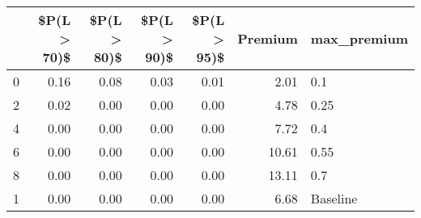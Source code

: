 \begin{tabular}{lrrrrrl}
\toprule
{} &  \$P(L > 70)\$ &  \$P(L > 80)\$ &  \$P(L > 90)\$ &  \$P(L > 95)\$ &  Premium & max\_premium \\
\midrule
0 &         0.16 &         0.08 &         0.03 &         0.01 &     2.01 &         0.1 \\
2 &         0.02 &         0.00 &         0.00 &         0.00 &     4.78 &        0.25 \\
4 &         0.00 &         0.00 &         0.00 &         0.00 &     7.72 &         0.4 \\
6 &         0.00 &         0.00 &         0.00 &         0.00 &    10.61 &        0.55 \\
8 &         0.00 &         0.00 &         0.00 &         0.00 &    13.11 &         0.7 \\
1 &         0.00 &         0.00 &         0.00 &         0.00 &     6.68 &    Baseline \\
\bottomrule
\end{tabular}
